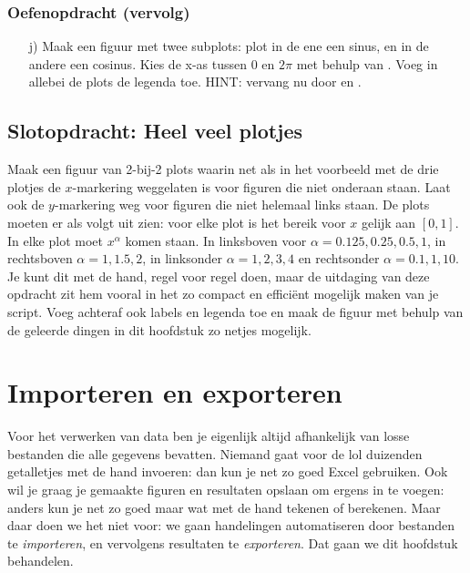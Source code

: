 \documentclass[a4paper,11pt, fleqn]{article}
\newcommand{\ditwc}{Naam van het huidige werkcollege}
\begin{document}
\subsubsection*{Oefenopdracht (vervolg)}
\begin{itemize}
	\item[j)] Maak een figuur met twee subplots: plot in de ene een sinus, en in de andere een cosinus. Kies de x-as tussen 0 en $2\pi$ met behulp van . Voeg in allebei de plots de legenda toe. HINT: vervang  nu door  en .
\end{itemize}

\subsection{Slotopdracht: Heel veel plotjes}
Maak een figuur van 2-bij-2 plots waarin net als in het voorbeeld met de drie plotjes de $x$-markering weggelaten is voor figuren die niet onderaan staan. Laat ook de $y$-markering weg voor figuren die niet helemaal links staan. 
De plots moeten er als volgt uit zien: voor elke plot is het bereik voor $x$ gelijk aan $[0,1]$. In elke plot moet $x^\alpha$ komen staan. In linksboven voor $\alpha = 0.125,0.25,0.5,1$, in rechtsboven $\alpha = 1,1.5,2$, in linksonder $\alpha = 1,2,3,4$ en rechtsonder $\alpha = 0.1,1,10$. Je kunt dit met de hand, regel voor regel doen, maar de uitdaging van deze opdracht zit hem vooral in het zo compact en efficiënt mogelijk maken van je script. Voeg achteraf ook labels en legenda toe en maak de figuur met behulp van de geleerde dingen in dit hoofdstuk zo netjes mogelijk.


\clearpage
\renewcommand{\ditwc}{Importeren en exporteren}
\section[Importeren en exporteren]{\ditwc}
Voor het verwerken van data ben je eigenlijk altijd afhankelijk van losse bestanden die alle gegevens bevatten. Niemand gaat voor de lol duizenden getalletjes met de hand invoeren: dan kun je net zo goed Excel gebruiken. Ook wil je graag je gemaakte figuren en resultaten opslaan om ergens in te voegen: anders kun je net zo goed maar wat met de hand tekenen of berekenen. Maar daar doen we het niet voor: we gaan handelingen automatiseren door bestanden te \textit{importeren}, en vervolgens resultaten te \textit{exporteren}. Dat gaan we dit hoofdstuk behandelen.
\end{document}
